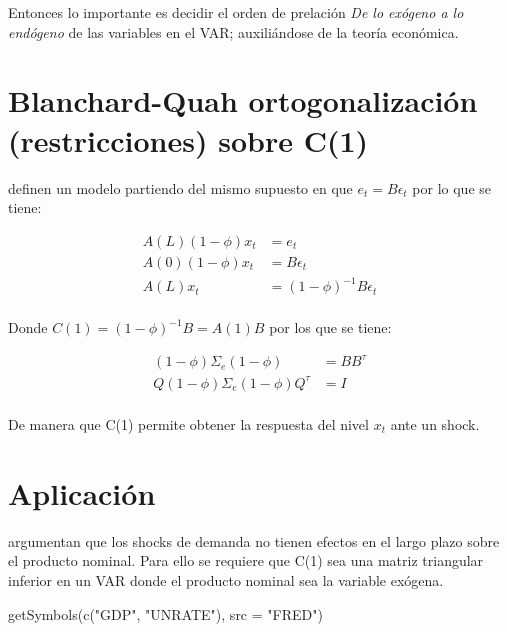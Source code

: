 \documentclass[
]{book}
\newenvironment{Shaded}{\begin{snugshade}}{\end{snugshade}}
\newcommand{\AttributeTok}[1]{\textcolor[rgb]{0.77,0.63,0.00}{#1}}
\newcommand{\FunctionTok}[1]{\textcolor[rgb]{0.00,0.00,0.00}{#1}}
\newcommand{\NormalTok}[1]{#1}
\newcommand{\StringTok}[1]{\textcolor[rgb]{0.31,0.60,0.02}{#1}}
\begin{document}
Entonces lo importante es decidir el orden de prelación \emph{De lo exógeno a lo endógeno} de las variables en el VAR; auxiliándose de la teoría económica.

\hypertarget{blanchard-quah-ortogonalizaciuxf3n-restricciones-sobre-c1}{%
\section{Blanchard-Quah ortogonalización (restricciones) sobre C(1)}\label{blanchard-quah-ortogonalizaciuxf3n-restricciones-sobre-c1}}

\citet{BLANCHARD88} definen un modelo partiendo del mismo supuesto en que \(e_{t}=B\epsilon_{t}\) por lo que se tiene:

\begin{align}
A(L)(1-\phi)x_{t}&=e_{t}\\
A(0)(1-\phi)x_{t}&=B\epsilon_{t}\\
A(L)x_{t}&=(1-\phi)^{-1}B\epsilon_{t}\\
\end{align}

Donde \(C(1)=(1-\phi)^{-1}B=A(1)B\) por los que se tiene:

\begin{align}
(1-\phi)\Sigma_{e}(1-\phi)&=BB^{\tau}\\
Q(1-\phi)\Sigma_e(1-\phi)Q^{\tau}&=I\\
\end{align}

De manera que C(1) permite obtener la respuesta del nivel \(x_{t}\) ante un shock.

\hypertarget{aplicaciuxf3n-blanchard88}{%
\section{\texorpdfstring{Aplicación \citet{BLANCHARD88}}{Aplicación @BLANCHARD88}}\label{aplicaciuxf3n-blanchard88}}

\citet{BLANCHARD88} argumentan que los shocks de demanda no tienen efectos en el largo plazo sobre el producto nominal. Para ello se requiere que C(1) sea una matriz triangular inferior en un VAR donde el producto nominal sea la variable exógena.

\begin{Shaded}
\begin{Highlighting}[]
\FunctionTok{getSymbols}\NormalTok{(}\FunctionTok{c}\NormalTok{(}\StringTok{"GDP"}\NormalTok{, }\StringTok{"UNRATE"}\NormalTok{),}
           \AttributeTok{src =} \StringTok{"FRED"}\NormalTok{)}
\end{Highlighting}
\end{Shaded}
\end{document}

